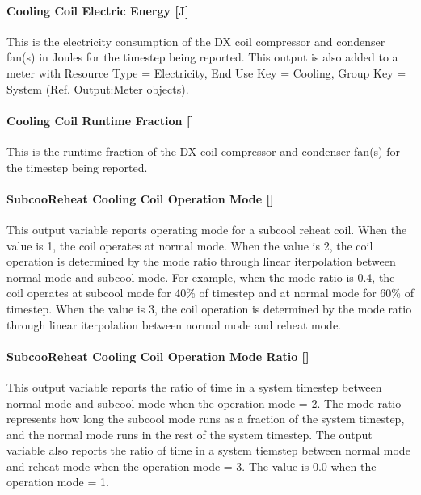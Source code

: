 \paragraph{Cooling Coil Electric Energy {[}J{]}}\label{cooling-coil-electric-energy-j}

This is the electricity consumption of the DX coil compressor and condenser fan(s) in Joules for the timestep being reported. This output is also added to a meter with Resource Type = Electricity, End Use Key = Cooling, Group Key = System (Ref. Output:Meter objects).

\paragraph{Cooling Coil Runtime Fraction {[]}}\label{cooling-coil-runtime-fraction}

This is the runtime fraction of the DX coil compressor and condenser fan(s) for the timestep being reported.

\paragraph{SubcooReheat Cooling Coil Operation Mode {[]}}\label{subcooreheat-cooling-coil-operation-mode}

This output variable reports operating mode for a subcool reheat coil. When the value is 1, the coil operates at normal mode. When the value is 2, the coil operation is determined by the mode ratio through linear iterpolation between normal mode and subcool mode. For example, when the mode ratio is 0.4, the coil operates at subcool mode for 40\% of timestep and at normal mode for 60\% of timestep. When the value is 3, the coil operation is determined by the mode ratio through linear iterpolation between normal mode and reheat mode.

\paragraph{SubcooReheat Cooling Coil Operation Mode Ratio {[]}}\label{subcooreheat-cooling-coil-operation-mode-ratio}

This output variable reports the ratio of time in a system timestep between normal mode and subcool mode when the operation mode = 2. The mode ratio represents how long the subcool mode runs as a fraction of the system timestep, and the normal mode runs in the rest of the system timestep. The output variable also reports the ratio of time in a system tiemstep between normal mode and reheat mode when the operation mode = 3. The value is 0.0 when the operation mode = 1.

